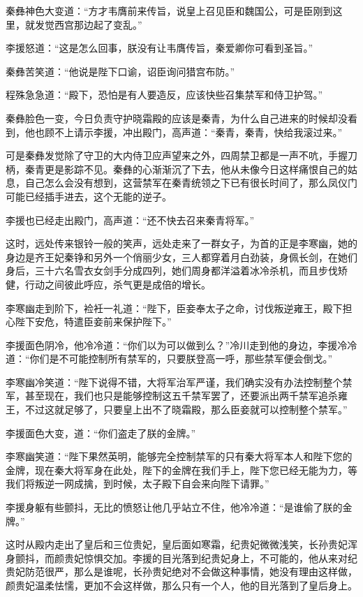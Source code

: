 秦彝神色大变道：“方才韦膺前来传旨，说皇上召见臣和魏国公，可是臣刚到这里，就发觉西宫那边起了变乱。”

李援怒道：“这是怎么回事，朕没有让韦膺传旨，秦爱卿你可看到圣旨。”

秦彝苦笑道：“他说是陛下口谕，诏臣询问猎宫布防。”

程殊急急道：“殿下，恐怕是有人要造反，应该快些召集禁军和侍卫护驾。”

秦彝脸色一变，今日负责守护晓霜殿的应该是秦青，为什么自己进来的时候却没看到，他也顾不上请示李援，冲出殿门，高声道：“秦青，秦青，快给我滚过来。”

可是秦彝发觉除了守卫的大内侍卫应声望来之外，四周禁卫都是一声不吭，手握刀柄，秦青更是影踪不见。秦彝的心渐渐沉了下去，他从未像今日这样痛恨自己的姑息，自己怎么会没有想到，这营禁军在秦青统领之下已有很长时间了，那么凤仪门可能已经插手进去，这个无能的逆子。

李援也已经走出殿门，高声道：“还不快去召来秦青将军。”

这时，远处传来银铃一般的笑声，远处走来了一群女子，为首的正是李寒幽，她的身边是齐王妃秦铮和另外一个俏丽少女，三人都穿着月白劲装，身佩长剑，在她们身后，三十六名雪衣女剑手分成四列，她们周身都洋溢着冰冷杀机，而且步伐矫健，行动之间彼此呼应，杀气更是成倍的增长。

李寒幽走到阶下，裣衽一礼道：“陛下，臣妾奉太子之命，讨伐叛逆雍王，殿下担心陛下安危，特遣臣妾前来保护陛下。”

李援面色阴冷，他冷冷道：“你们以为可以做到么？”冷川走到他的身边，李援冷冷道：“你们是不可能控制所有禁军的，只要朕登高一呼，那些禁军便会倒戈。”

李寒幽冷笑道：“陛下说得不错，大将军治军严谨，我们确实没有办法控制整个禁军，甚至现在，我们也只是能够控制这五千禁军罢了，还要派出两千禁军追杀雍王，不过这就足够了，只要皇上出不了晓霜殿，那么臣妾就可以控制整个禁军。”

李援面色大变，道：“你们盗走了朕的金牌。”

李寒幽笑道：“陛下果然英明，能够完全控制禁军的只有秦大将军本人和陛下您的金牌，现在秦大将军身在此处，陛下的金牌在我们手上，陛下您已经无能为力，等我们将叛逆一网成擒，到时候，太子殿下自会来向陛下请罪。”

李援身躯有些颤抖，无比的愤怒让他几乎站立不住，他冷冷道：“是谁偷了朕的金牌。”

这时从殿内走出了皇后和三位贵妃，皇后面如寒霜，纪贵妃微微浅笑，长孙贵妃浑身颤抖，而颜贵妃惊惧交加。李援的目光落到纪贵妃身上，不可能的，他从来对纪贵妃防范很严，那么是谁呢，长孙贵妃绝对不会做这种事情，她没有理由这样做，颜贵妃温柔怯懦，更加不会这样做，那么只有一个人，他的目光落到了皇后身上。

